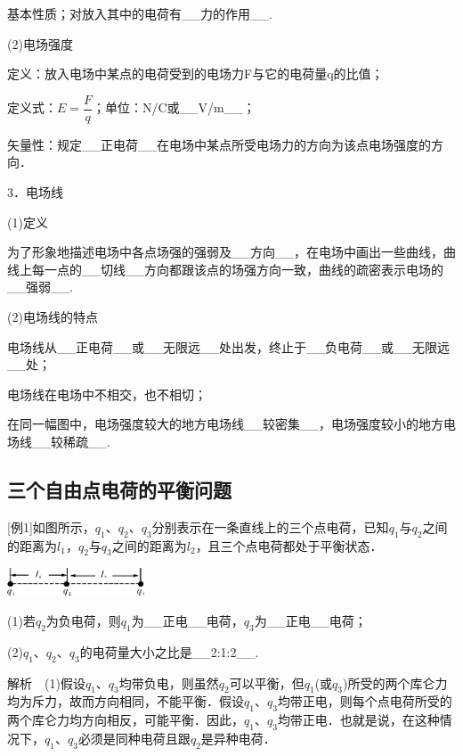 基本性质；对放入其中的电荷有\_\_力的作用\_\_.

(2)电场强度

定义：放入电场中某点的电荷受到的电场力F与它的电荷量q的比值；

定义式：$E=\dfrac{F}{q}$；单位：N/C或\_\_V/m\_\_；

矢量性：规定\_\_正电荷\_\_在电场中某点所受电场力的方向为该点电场强度的方向．

3．电场线

(1)定义

为了形象地描述电场中各点场强的强弱及\_\_方向\_\_，在电场中画出一些曲线，曲线上每一点的\_\_切线\_\_方向都跟该点的场强方向一致，曲线的疏密表示电场的\_\_强弱\_\_.

(2)电场线的特点

电场线从\_\_正电荷\_\_或\_\_无限远\_\_处出发，终止于\_\_负电荷\_\_或\_\_无限远\_\_处；

电场线在电场中不相交，也不相切；

在同一幅图中，电场强度较大的地方电场线\_\_较密集\_\_，电场强度较小的地方电场线\_\_较稀疏\_\_.

\newpage


\subsection{三个自由点电荷的平衡问题}

{[}例1{]}如图所示，$q_1$、$q_2$、$q_3$分别表示在一条直线上的三个点电荷，已知$q_1$与$q_2$之间的距离为$l_1$，$q_2$与$q_3$之间的距离为$l_2$，且三个点电荷都处于平衡状态．

\begin{center}\includegraphics[width=1.60417in,height=0.32292in]{media/image260.png}\end{center}

(1)若$q_2$为负电荷，则$q_1$为\_\_正电\_\_电荷，$q_3$为\_\_正电\_\_电荷；

(2)$q_1$、$q_2$、$q_3$的电荷量大小之比是\_\_2:1:2\_\_.

解析　(1)假设$q_1$、$q_3$均带负电，则虽然$q_2$可以平衡，但$q_1$(或$q_3$)所受的两个库仑力均为斥力，故而方向相同，不能平衡．假设$q_1$、$q_3$均带正电，则每个点电荷所受的两个库仑力均方向相反，可能平衡．因此，$q_1$、$q_3$均带正电．也就是说，在这种情况下，$q_1$、$q_3$必须是同种电荷且跟$q_2$是异种电荷．

